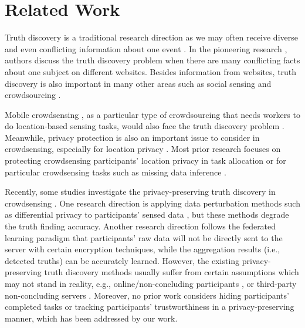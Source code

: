 \section{Related Work}



Truth discovery is a traditional research direction as we may often receive diverse and even conflicting information about one event \citep{li2016survey}. In the pioneering research \citep{yin2008truth}, authors discuss the truth discovery problem when there are many conflicting facts about one subject on different websites.
Besides information from websites, truth discovery is also important in many other areas such as social sensing \citep{wang2012truth} and crowdsourcing \citep{li2014the,Whitehill2009WhoseVS}.

Mobile crowdsensing \citep{zhang20144w1h}, as a particular type of crowdsourcing that needs workers to do location-based sensing tasks, would also face the truth discovery problem \citep{Wang2014SurrogateMS}. Meanwhile, privacy protection is also an important issue to consider in crowdsensing, especially for location privacy \citep{han2021hidden,wang2016differential,Wang2017LocationPT,Wang2019PersonalizedPT,Wang2020SparseMC,Wang2019MobileCT}. Most prior research focuses on protecting crowdsensing participants' location privacy in task allocation \citep{Wang2017LocationPT,Wang2019PersonalizedPT,Wang2019MobileCT} or for particular crowdsensing tasks such as missing data inference \citep{wang2016differential,Wang2020SparseMC}. 

Recently, some studies investigate the privacy-preserving truth discovery in crowdsensing \citep{Miao2015CloudEnabledPT,Miao2017ALP,Miao2019PrivacyPreservingTD,Zhang2021ReliableAP,ZHANG2020101848,Xu2019EfficientAP}. One research direction is applying data perturbation methods such as differential privacy to participants' sensed data \citep{Li2018AnET,Li2020TowardsDP}, but these methods degrade the truth finding accuracy. Another research direction follows the federated learning \citep{yang2019federated} paradigm that participants' raw data will not be directly sent to the server with certain encryption techniques, while the aggregation results (i.e., detected truths) can be accurately learned. However, the existing privacy-preserving truth discovery methods usually suffer from certain assumptions which may not stand in reality, e.g., online/non-concluding participants \citep{Miao2015CloudEnabledPT,Miao2017ALP,Miao2019PrivacyPreservingTD}, or third-party non-concluding servers \citep{Zhang2021ReliableAP,ZHANG2020101848}. 
Moreover, no prior work considers hiding participants' completed tasks or tracking participants' trustworthiness in a privacy-preserving manner, which has been addressed by our work.

